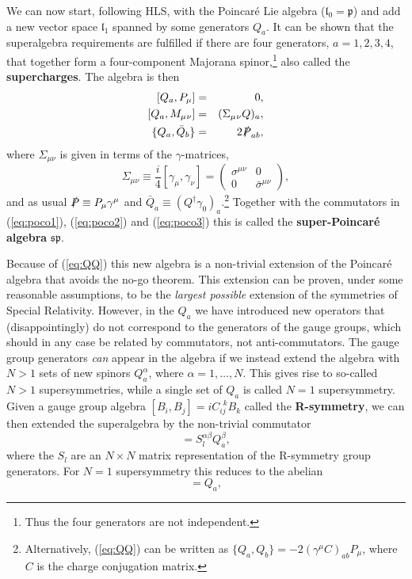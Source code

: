 \documentclass[notes.tex]{subfiles}
\begin{document}
We can now start, following HLS, with the Poincaré Lie algebra ($\mathfrak  l_0 = \mathfrak p$) and add a new vector space $\mathfrak l_1$ spanned by some generators $Q_a$. It can be shown that the superalgebra requirements are fulfilled if there are four generators, $a=1,2,3,4$, that together form a four-component Majorana spinor,\footnote{Thus the four generators are not independent.} also called the {\bf supercharges}. The algebra is then
\begin{eqnarray}
\left[Q_a, P_\mu\right] &=& 0,  \label{eq:QP} \\
\left[Q_a, M_\mu{}_\nu\right] &=& (\Sigma_{\mu}{}_\nu Q)_a, \label{eq:QM}\\
\{Q_a, \bar{Q}_b\} &=& 2 \slashed{P}_{ab},\label{eq:QQ}
\end{eqnarray}
where $\Sigma_{\mu\nu}$ is given in terms of the $\gamma$-matrices, 
\[\Sigma_{\mu\nu} \equiv \frac{i}{4}[\gamma_\mu, \gamma_\nu]=\begin{pmatrix}\sigma^{\mu\nu} & 0 \\  0 & \bar\sigma^{\mu\nu} \end{pmatrix},\] 
and as usual $\slashed{P}\equiv P_\mu\gamma^\mu$ and $\bar{Q}_a \equiv (Q^\dagger \gamma_0)_a$.\footnote{Alternatively, (\ref{eq:QQ}) can be written as $\{Q_a, Q_b\} = -2(\gamma^\mu C)_{ab}P_\mu$, where $C$ is the charge conjugation matrix.}
Together with the commutators in (\ref{eq:poco1}), (\ref{eq:poco2}) and (\ref{eq:poco3}) this is called the {\bf super-Poincaré algebra} $\mathfrak{sp}$.

Because of (\ref{eq:QQ}) this new algebra is a non-trivial extension of the Poincaré algebra that avoids the no-go theorem. This extension can be proven, under some reasonable assumptions, to be the {\it largest possible} extension of the symmetries of Special Relativity. However, in the $Q_a$ we have introduced new operators that (disappointingly) do not correspond to the generators of the gauge groups, which should in any case  be related by commutators, not anti-commutators. The gauge group generators {\it can} appear in the algebra if we instead extend the algebra with $N>1$ sets of new spinors $Q_a^\alpha$, where $\alpha = 1,\ldots,N$. This gives rise to so-called $N>1$ supersymmetries, while a single set of $Q_a$ is called $N=1$ supersymmetry. Given a gauge group algebra $[B_i,B_j]=iC_{ij}^{~~k}B_k$ called the {\bf R-symmetry}, we can then extended the superalgebra by the non-trivial commutator
\begin{equation*}
[Q_a^\alpha,B_l]=S_l^{\alpha\beta}Q_a^\beta,
\end{equation*}
where the $S_l$ are an $N\times N$ matrix representation of the R-symmetry group generators. For $N=1$ supersymmetry this reduces to the abelian
\begin{equation}
[Q_a,B]=Q_a,
\label{eq:QR_commutator_dirac}
\end{equation}
\end{document}
